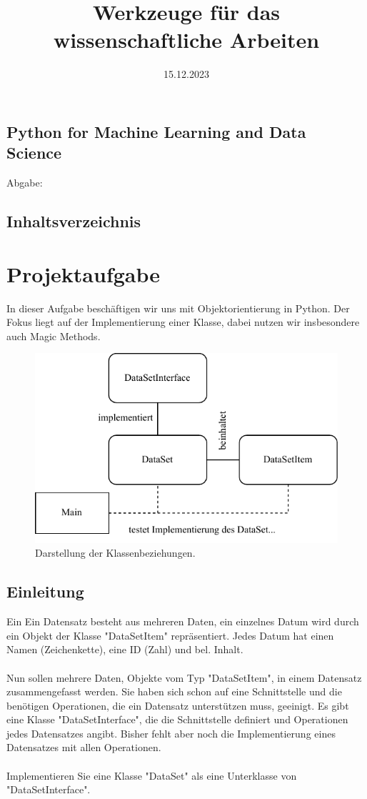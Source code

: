 \documentclass[]{article}
\begin{document}
\title{Werkzeuge für das wissenschaftliche Arbeiten}

\maketitle
\begin{center}
	\section*{Python for Machine Learning and Data Science}
	Abgabe: \date{15.12.2023}
\end{center}

\subsection{Inhaltsverzeichnis}
\tableofcontents
\section{Projektaufgabe}
In dieser Aufgabe beschäftigen wir uns mit Objektorientierung in Python.
Der Fokus liegt auf der Implementierung einer Klasse, dabei nutzen wir insbesondere auch Magic Methods.\\
\begin{figure}[ht]
	\centering
	\includegraphics{./../diagram/classes_files.pdf}
	\caption{Darstellung der Klassenbeziehungen.}
\end{figure}
\subsection{Einleitung}
Ein Ein Datensatz besteht aus mehreren Daten, ein einzelnes Datum wird durch ein Objekt der Klasse "DataSetItem" repräsentiert.
Jedes Datum hat einen Namen (Zeichenkette), eine ID (Zahl) und bel. Inhalt.\\
\\
Nun sollen mehrere Daten, Objekte vom Typ "DataSetItem", in einem Datensatz zusammengefasst werden.
Sie haben sich schon auf eine Schnittstelle und die benötigen Operationen, die ein Datensatz unterstützen muss, geeinigt.
Es gibt eine Klasse "DataSetInterface", die die Schnittstelle definiert und Operationen jedes Datensatzes angibt.
Bisher fehlt aber noch die Implementierung eines Datensatzes mit allen Operationen.\\
\\
Implementieren Sie eine Klasse "DataSet" als eine Unterklasse von "DataSetInterface".\\
\end{document}
